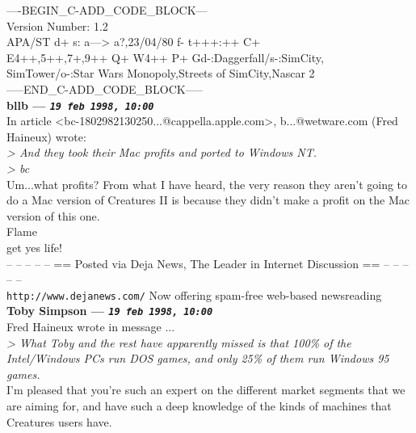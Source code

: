 \documentclass[11pt,twoside,a4paper]{article}
\begin{document}
\begin{multicols*}{2}
----BEGIN\_C-ADD\_CODE\_BLOCK---~\\
Version Number: 1.2~\\
APA/ST d+ s: a---> a?,23/04/80 f- t+++:++ C+~\\
E4++,5++,7+,9++ Q+ W4++ P+ Gd-:Daggerfall/s-:SimCity,~\\
SimTower/o-:Star Wars Monopoly,Streets of SimCity,Nascar 2~\\
-----END\_C-ADD\_CODE\_BLOCK-----~\\

 
		
	
		
\textbf{bllb --- \emph{\texttt{19 feb 1998, 10:00}}}~\\

In article <bc-1802982130250...@cappella.apple.com>,  b...@wetware.com (Fred Haineux) wrote:~\\

\emph{> And they took their Mac profits and ported to Windows NT.}~\\

\emph{> bc}~\\

Um...what profits? From what I have heard, the very reason they aren't going to do a Mac version of Creatures II is because they didn't make a profit on the Mac version of this one.~\\

Flame~\\
get yes life!~\\

-- -- -- -- -- == Posted via Deja News, The Leader in Internet Discussion == -- -- -- -- -- ~\\
\texttt{http://www.dejanews.com/}   Now offering spam-free web-based newsreading~\\

 
		
	
		
\textbf{Toby Simpson --- \emph{\texttt{19 feb 1998, 10:00}}}~\\

Fred Haineux wrote in message ...~\\
\emph{> What Toby and the rest have apparently missed is that 100\% of the Intel/Windows PCs run DOS games, and only 25\% of them run Windows 95 games.}~\\

I'm pleased that you're such an expert on the different market segments that we are aiming for, and have such a deep knowledge of the kinds of machines that Creatures users have.~\\


\end{multicols*}
\end{document}

